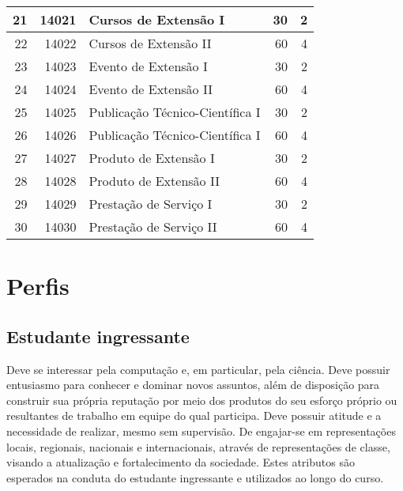 \documentclass[
	12pt,				%
	openright,			%
  oneside,     %
	a4paper,			%
	english,			%
	french,				%
	spanish,			%
	brazil				%
	]{abntex2}
\begin{document}
\begin{longtable}{r|r|l|r|r}
    21    & 14021 & Cursos de Extensão I & 30    & 2 \\    \hline
    22    & 14022 & Cursos de Extensão II & 60    & 4 \\    \hline
    23    & 14023 & Evento de Extensão I & 30    & 2 \\    \hline
    24    & 14024 & Evento de Extensão II & 60    & 4 \\    \hline
    25    & 14025 & Publicação Técnico-Científica I & 30    & 2 \\    \hline
    26    & 14026 & Publicação Técnico-Científica I & 60    & 4 \\    \hline
    27    & 14027 & Produto de Extensão I & 30    & 2 \\    \hline
    28    & 14028 & Produto de Extensão II & 60    & 4 \\    \hline
    29    & 14029 & Prestação de Serviço I & 30    & 2 \\    \hline
    30    & 14030 & Prestação de Serviço II & 60    & 4 \\    \hline
    \end{longtable}%



%
%



\chapter{Perfis}

\section{Estudante ingressante}

Deve se interessar pela computação e, em particular, pela ciência. Deve possuir
entusiasmo para conhecer e dominar novos assuntos, além de disposição  para
construir sua própria reputação por meio dos produtos do seu esforço  próprio ou
resultantes de trabalho em equipe do qual participa.  Deve possuir atitude e a
necessidade de realizar, mesmo sem supervisão. De engajar-se em representações
locais, regionais, nacionais e internacionais, através de representações de
classe, visando a atualização e fortalecimento da sociedade. Estes atributos são
esperados na conduta do estudante ingressante e utilizados ao longo do curso.
\end{document}
